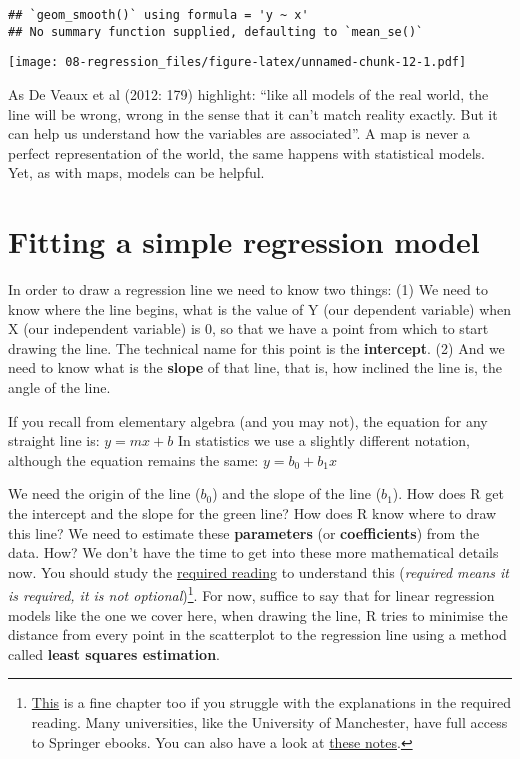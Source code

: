 \documentclass[
]{book}
\begin{document}
\begin{verbatim}
## `geom_smooth()` using formula = 'y ~ x'
## No summary function supplied, defaulting to `mean_se()`
\end{verbatim}

\texttt{[image: 08-regression\_files/figure-latex/unnamed-chunk-12-1.pdf]}

As De Veaux et al (2012: 179) highlight: ``like all models of the real world, the line will be wrong, wrong in the sense that it can't match reality exactly. But it can help us understand how the variables are associated''. A map is never a perfect representation of the world, the same happens with statistical models. Yet, as with maps, models can be helpful.

\section{Fitting a simple regression model}\label{fitting-a-simple-regression-model}

In order to draw a regression line we need to know two things:
(1) We need to know where the line begins, what is the value of Y (our dependent variable) when X (our independent variable) is 0, so that we have a point from which to start drawing the line. The technical name for this point is the \textbf{intercept}.
(2) And we need to know what is the \textbf{slope} of that line, that is, how inclined the line is, the angle of the line.

If you recall from elementary algebra (and you may not), the equation for any straight line is:
\(y = mx + b\)
In statistics we use a slightly different notation, although the equation remains the same:
\(y = b_0 + b_1x\)

We need the origin of the line (\(b_0\)) and the slope of the line (\(b_1\)). How does R get the intercept and the slope for the green line? How does R know where to draw this line? We need to estimate these \textbf{parameters} (or \textbf{coefficients}) from the data. How? We don't have the time to get into these more mathematical details now. You should study the \href{http://link.springer.com/chapter/10.1007/978-1-4614-7138-7_3}{required reading} to understand this (\emph{required means it is required, it is not optional})\footnote{\href{http://link.springer.com/chapter/10.1007/978-1-4614-9170-5_15}{This} is a fine chapter too if you struggle with the explanations in the required reading. Many universities, like the University of Manchester, have full access to Springer ebooks. You can also have a look at \href{http://people.stern.nyu.edu/wgreene/Statistics/MultipleRegressionBasicsCollection.pdf}{these notes}.}. For now, suffice to say that for linear regression models like the one we cover here, when drawing the line, R tries to minimise the distance from every point in the scatterplot to the regression line using a method called \textbf{least squares estimation}.
\end{document}
